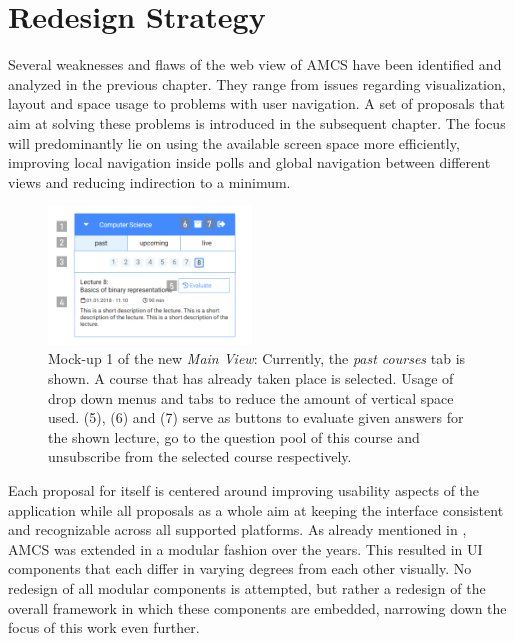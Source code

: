 \chapter{Redesign Strategy}
\label{chapter:redesignstrategy}
Several weaknesses and flaws of the web view of AMCS have been identified and analyzed in the previous chapter. They range from issues regarding visualization, layout and space usage to problems with user navigation.
A set of proposals that aim at solving these problems is introduced in the subsequent chapter. The focus will predominantly lie on using the available screen space more efficiently, improving local navigation inside polls and global navigation between different views and reducing indirection to a minimum.
\begin{figure}
	\vspace*{-0.5cm}
	\begin{center}
		\includegraphics[width=0.48\textwidth]{mockups/main_view_enhancement_v1_annotated.png}
	\end{center}
	\captionsetup{format=plain}
	\caption{Mock-up 1 of the new \emph{Main View}: Currently, the \emph{past courses} tab is shown.
		A course that has already taken place is selected.
		Usage of drop down menus and tabs to reduce the amount of vertical space used. (5), (6) and (7) serve as buttons to evaluate given answers for the shown lecture, go to the question pool of this course and unsubscribe from the selected course respectively.
	}
	\label{figure:mainviewenhancement}
	\vspace*{-1.5cm}
\end{figure}
Each proposal for itself is centered around improving usability aspects of the application while all proposals as a whole aim at keeping the interface consistent and recognizable across all supported platforms.
As already mentioned in , AMCS was extended in a modular fashion over the years. This resulted in UI components that each differ in varying degrees from each other visually. 
No redesign of all modular components is attempted, but rather a redesign of the overall framework in which these components are embedded, narrowing down the focus of this work even further.
